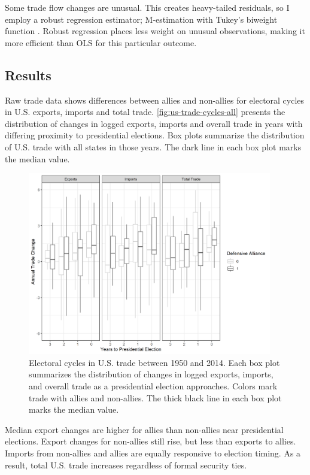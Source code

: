 \documentclass[12pt]{article}
\begin{document}
Some trade flow changes are unusual. 
This creates heavy-tailed residuals, so I employ a robust regression estimator; M-estimation with Tukey's biweight function \citep{RaineyBaissa2020}.
Robust regression places less weight on unusual observations, making it more efficient than OLS for this particular outcome.



\subsection{Results}


Raw trade data shows differences between allies and non-allies for electoral cycles in U.S. exports, imports and total trade. 
\autoref{fig:us-trade-cycles-all} presents the distribution of changes in logged exports, imports and overall trade in years with differing proximity to presidential elections.
Box plots summarize the distribution of U.S. trade with all states in those years. 
The dark line in each box plot marks the median value. 


\begin{figure}
\centering
\includegraphics[width=0.95\textwidth]{../figures/us-trade-cycles-all.png}
\caption{Electoral cycles in U.S. trade between 1950 and 2014. Each box plot summarizes the distribution of changes in logged exports, imports, and overall trade as a presidential election approaches. Colors mark trade with allies and non-allies. The thick black line in each box plot marks the median value.}
\label{fig:us-trade-cycles-all}
\end{figure}


Median export changes are higher for allies than non-allies near presidential elections. 
Export changes for non-allies still rise, but less than exports to allies. 
Imports from non-allies and allies are equally responsive to election timing. 
As a result, total U.S. trade increases regardless of formal security ties.
\end{document}
